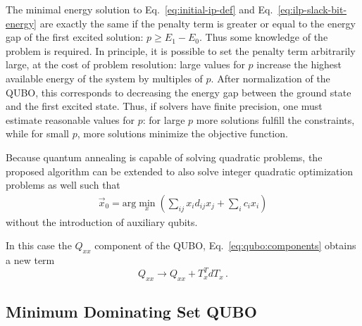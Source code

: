 \documentclass[10pt]{iopart}
\begin{document}
The minimal energy solution to Eq.~\eqref{eq:initial-ip-def} and Eq.~\eqref{eq:ilp-slack-bit-energy} are exactly the same if the penalty term is greater or equal to the energy gap of the first excited solution: $p \geq E_1 - E_0$.
Thus some knowledge of the problem is required.
In principle, it is possible to set the penalty term arbitrarily large, at the cost of problem resolution: large values for $p$ increase the highest available energy of the system by multiples of $p$.
After normalization of the QUBO, this corresponds to decreasing the energy gap between the ground state and the first excited state.
Thus, if solvers have finite precision, one must estimate reasonable values for $p$: for large $p$ more solutions fulfill the constraints, while for small $p$, more solutions minimize the objective function.

Because quantum annealing is capable of solving quadratic problems, the proposed algorithm can be extended to also solve integer quadratic optimization problems as well such that
\begin{align}
 \vec x_0 = \mathrm{arg}\min\limits_{x}\left(\sum_{ij} x_i d_{ij} x_j + \sum_i c_i x_i\right)
\end{align}
without the introduction of auxiliary qubits.

In this case the $Q_{xx}$ component of the QUBO, Eq.~\eqref{eq:qubo:components} obtains a new term
\begin{equation}
    Q_{xx} \to Q_{xx} + T_x^T d T_x \, .
\end{equation}


\subsection{Minimum Dominating Set QUBO}
\label{sec:methods:mds-qubo}
\end{document}
